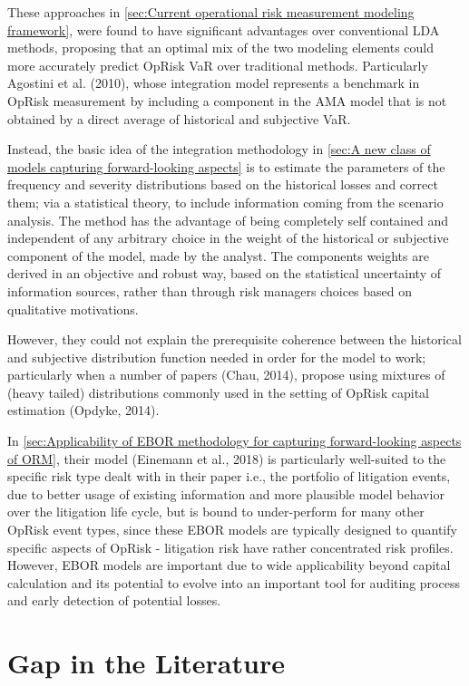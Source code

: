\documentclass{DissertateUSU}
\begin{document}
These approaches in
\ref{sec:Current operational risk measurement modeling framework}, were
found to have significant advantages over conventional LDA methods,
proposing that an optimal mix of the two modeling elements could more
accurately predict OpRisk VaR over traditional methods. Particularly
Agostini et al. (2010), whose integration model represents a benchmark
in OpRisk measurement by including a component in the AMA model that is
not obtained by a direct average of historical and subjective
VaR.\medskip

Instead, the basic idea of the integration methodology in
\ref{sec:A new class of models capturing forward-looking aspects} is to
estimate the parameters of the frequency and severity distributions
based on the historical losses and correct them; via a statistical
theory, to include information coming from the scenario analysis. The
method has the advantage of being completely self contained and
independent of any arbitrary choice in the weight of the historical or
subjective component of the model, made by the analyst. The components
weights are derived in an objective and robust way, based on the
statistical uncertainty of information sources, rather than through risk
managers choices based on qualitative motivations. \medskip

However, they could not explain the prerequisite coherence between the
historical and subjective distribution function needed in order for the
model to work; particularly when a number of papers (Chau, 2014),
propose using mixtures of (heavy tailed) distributions commonly used in
the setting of OpRisk capital estimation (Opdyke, 2014).\medskip

In
\ref{sec:Applicability of EBOR methodology for capturing forward-looking aspects of ORM},
their model (Einemann et al., 2018) is particularly well-suited to the
specific risk type dealt with in their paper i.e., the portfolio of
litigation events, due to better usage of existing information and more
plausible model behavior over the litigation life cycle, but is bound to
under-perform for many other OpRisk event types, since these EBOR models
are typically designed to quantify specific aspects of OpRisk -
litigation risk have rather concentrated risk profiles. However, EBOR
models are important due to wide applicability beyond capital
calculation and its potential to evolve into an important tool for
auditing process and early detection of potential losses.\medskip

\section{Gap in the Literature}
\label{sec:Gap in the Literature}
\end{document}
